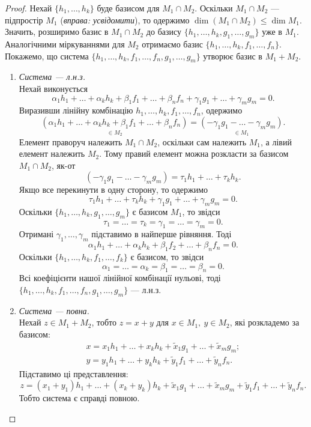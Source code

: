 \documentclass{math_library}
\begin{document}
	\begin{proof}
	Нехай $\{h_1, \dots, h_k\}$ буде базисом для $M_1 \cap M_2$. Оскільки $M_1 \cap M_2$ --- підпростір $M_1$ (\textit{вправа: усвідомити}), то одержимо $\dim (M_1 \cap M_2) \leq \dim M_1$. Значить, розширимо базис в $M_1 \cap M_2$ до базису $\{h_1, \dots, h_k, g_1, \dots, g_m\}$ уже в $M_1$. \\
	Аналогічними міркуваннями для $M_2$ отримаємо базис $\{h_1, \dots, h_k, f_1, \dots, f_n\}$.\\
	Покажемо, що система $\{h_1, \dots, h_k, f_1, \dots, f_n, g_1, \dots, g_m\}$ утворює базис в $M_1 + M_2$.
	
	\begin{enumerate}[wide=0pt,label={\Roman*.}]
	\item \textit{Система --- л.н.з.}\\
	Нехай виконується
	\[
	\alpha_1 h_1 + \dots + \alpha_k h_k + \beta_1 f_1 + \dots + \beta_n f_n + \gamma_1 g_1 + \dots + \gamma_m g_m = 0.
	\]
	Виразивши лінійну комбінацію $h_1,\dots,h_k,f_1,\dots,f_n$, одержимо
	\[
	\underset{\in M_2}{(\alpha_1 h_1 + \dots + \alpha_k h_k + \beta_1 f_1 + \dots + \beta_n f_n)} = \underset{\in M_1}{(-\gamma_1 g_1 - \dots - \gamma_m g_m)}.
	\]
	Елемент праворуч належить $M_1 \cap M_2$, оскільки сам належить $M_1$, а лівий елемент належить $M_2$. Тому правий елемент можна розкласти за базисом $M_1 \cap M_2$, як-от
	\[
	(-\gamma_1 g_1 - \dots - \gamma_m g_m) = \tau_1 h_1 + \dots + \tau_k h_k.
	\]
	Якщо все перекинути в одну сторону, то одержимо
	\[
	\tau_1 h_1 + \dots + \tau_k h_k +\gamma_1 g_1 + \dots + \gamma_m g_m = 0.
	\]
	Оскільки $\{h_1, \dots, h_k, g_1, \dots, g_m\}$ є базисом $M_1$, то звідси 
	\[
	\tau_1 = \dots = \tau_k = \gamma_1 = \dots = \gamma_m = 0.
	\]
	Отримані $\gamma_1,\dots,\gamma_m$ підставимо в найперше рівняння. Тоді
	\[
	\alpha_1 h_1 + \dots + \alpha_k h_k + \beta_1 f_2 + \dots + \beta_n f_n = 0.
	\]
	Оскільки $\{h_1, \dots, h_k, f_1, \dots, f_k\}$ є базисом, то звідси 
	\[
	\alpha_1 = \dots = \alpha_k = \beta_1 = \dots = \beta_n = 0.
	\]
	Всі коефіцієнти нашої лінійної комбінації нульові, тоді $\{h_1, \dots, h_k, f_1, \dots, f_n, g_1, \dots, g_m\}$ --- л.н.з.
	
	\item \textit{Система --- повна.}\\
	Нехай $z \in M_1+M_2$, тобто $z = x + y$ для $x \in M_1,\ y \in M_2$, які розкладемо за базисом:
	\begin{align*}
	x = x_1 h_1 + \dots + x_k h_k + \tilde{x}_1 g_1 + \dots + \tilde{x}_m g_m ; \\
	y = y_1 h_1 + \dots + y_k h_k + \tilde{y}_1 f_1 + \dots + \tilde{y}_n f_n.
	\end{align*}
	Підставимо ці представлення:
	\[
	z = (x_1 + y_1)h_1 + \dots + (x_k + y_k)h_k + \tilde{x}_1 g_1 + \dots + \tilde{x}_m g_m + \tilde{y}_1 f_1 + \dots + \tilde{y}_n f_n.
	\]
	Тобто система є справді повною.
	\end{enumerate}
	

\end{proof}
\end{document}
